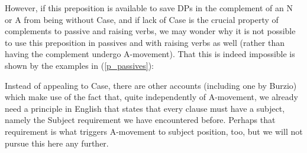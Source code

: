 \documentclass{article}
\begin{document}
However, if this preposition is available to save DPs in the complement of an N or A from being without Case, and if lack of Case is the crucial property of complements to passive and raising verbs, we may wonder why it is not possible to use this preposition in passives and with raising verbs as well (rather than having the complement undergo A-movement).
That this is indeed impossible is shown by the examples in (\ref{p_passives}):
\begin{exe}
    \label{p_passives}
\end{exe}
Instead of appealing to Case, there are other accounts (including one by Burzio) which make use of the fact that, quite independently of A-movement, we already need a principle in English that states that every clause must have a subject, namely the Subject requirement we have encountered before.
Perhaps that requirement is what triggers A-movement to subject position, too, but we will not pursue this here any further.

\printbibliography
\end{document}
